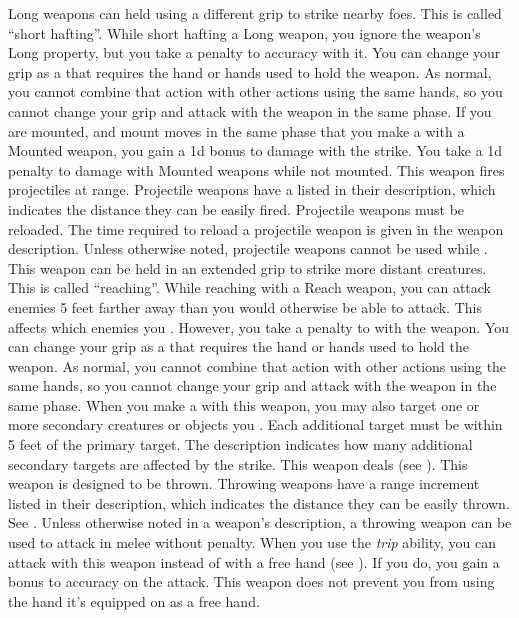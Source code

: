         Long weapons can held using a different grip to strike nearby foes.
        This is called ``short hafting''.
        While short hafting a Long weapon, you ignore the weapon's Long property, but you take a  penalty to accuracy with it.
        You can change your grip as a  that requires the hand or hands used to hold the weapon.
        As normal, you cannot combine that action with other actions using the same hands, so you cannot change your grip and attack with the weapon in the same phase.
        \label{Mounted Weapon} If you are mounted, and mount moves in the same phase that you make a  with a Mounted weapon, you gain a \plus1d bonus to damage with the strike.
        You take a \minus1d penalty to damage with Mounted weapons while not mounted.
         This weapon fires projectiles at range. Projectile weapons have a  listed in their description, which indicates the distance they can be easily fired. Projectile weapons must be reloaded. The time required to reload a projectile weapon is given in the weapon description.
        Unless otherwise noted, projectile weapons cannot be used while \prone.
        \label{Reach Weapon} This weapon can be held in an extended grip to strike more distant creatures.
        This is called ``reaching''.
        While reaching with a Reach weapon, you can attack enemies 5 feet farther away than you would otherwise be able to attack.
        This affects which enemies you .
        However, you take a  penalty to  with the weapon.
        You can change your grip as a  that requires the hand or hands used to hold the weapon.
        As normal, you cannot combine that action with other actions using the same hands, so you cannot change your grip and attack with the weapon in the same phase.
         When you make a  with this weapon, you may also target one or more secondary creatures or objects you .
        Each additional target must be within 5 feet of the primary target.
        The description indicates how many additional secondary targets are affected by the strike.
         This weapon deals  (see ).
         This weapon is designed to be thrown. Throwing weapons have a range increment listed in their description, which indicates the distance they can be easily thrown. See .
        Unless otherwise noted in a weapon's description, a throwing weapon can be used to attack in melee without penalty.
         When you use the \textit{trip} ability, you can attack with this weapon instead of with a free hand (see ).
        If you do, you gain a  bonus to accuracy on the attack.
         This weapon does not prevent you from using the hand it's equipped on as a free hand.

